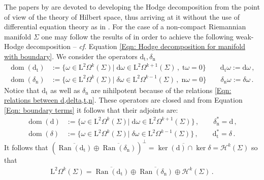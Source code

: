 	The papers by \parencite{Axelsson-McIntosh-04,Gaffney-55} are devoted to developing the Hodge decomposition from the point of view of the theory of Hilbert space, thus arriving at it without the use of differential equation theory as in \parencite{Schwarz-95}. For the case of a non-compact Riemannian manifold $\Sigma$ one may follow the results of \parencite{Axelsson-McIntosh-04} in order to achieve the following weak-Hodge decomposition -- \textit{cf}. Equation \eqref{Eqn: Hodge decomposition for manifold with boundary}.
	We consider the operators $\mathrm{d}_{\mathrm{t}},\delta_{\mathrm{n}}$
	\begin{align}
		\label{Eqn: Dirichlet differential}
		\operatorname{dom}(\mathrm{d}_{\mathrm{t}})&:=\lbrace
		\omega\in\mathrm{L}^2\Omega^k(\Sigma)|\;\mathrm{d}\omega\in\mathrm{L}^2\Omega^{k+1}(\Sigma)\,,\;\mathrm{t}\omega=0\rbrace\qquad
		\mathrm{d}_{\mathrm{t}}\omega:=\mathrm{d}\omega\,,\\
		\label{Eqn: Neumann codifferential}
		\operatorname{dom}(\delta_{\mathrm{n}})&:=\lbrace
		\omega\in\mathrm{L}^2\Omega^k(\Sigma)|\;\delta\omega\in\mathrm{L}^2\Omega^{k-1}(\Sigma)\,,\;\mathrm{n}\omega=0\rbrace\qquad
		\delta_{\mathrm{n}}\omega:=\delta\omega\,.
	\end{align}
	Notice that $\mathrm{d}_{\mathrm{t}}$ as well as $\delta_{\mathrm{n}}$ are nihilpotent because of the relations \eqref{Eqn: relations between d,delta,t,n}.
	These operators are closed and from Equation \eqref{Eqn: boundary terms} it follows that their adjoints are:
	\begin{align*}
		\operatorname{dom}(\mathrm{d})&:=\lbrace
		\omega\in\mathrm{L}^2\Omega^k(\Sigma)|\;\mathrm{d}\omega\in\mathrm{L}^2\Omega^{k+1}(\Sigma)\rbrace\,,\qquad
		\delta_{\mathrm{n}}^*=\mathrm{d}\,,\\
		\operatorname{dom}(\delta)&:=\lbrace
		\omega\in\mathrm{L}^2\Omega^k(\Sigma)|\;\delta\omega\in\mathrm{L}^2\Omega^{k-1}(\Sigma)\rbrace\,,\qquad
		\mathrm{d}_{\mathrm{t}}^*=\delta\,.
	\end{align*}
	It follows that $(\overline{\operatorname{Ran}(\mathrm{d}_{\mathrm{t}})}\oplus\overline{\operatorname{Ran}(\delta_{\mathrm{n}})})^\perp=\overline{\ker(\mathrm{d})\cap\ker\delta}=\mathcal{H}^k(\Sigma)$ so that
	\begin{align}\label{Eqn: weak-Hodge decomposition for boundary}
		\mathrm{L}^2\Omega^k(\Sigma)=
		\overline{\operatorname{Ran}(\mathrm{d}_{\mathrm{t}})}\oplus
		\overline{\operatorname{Ran}(\delta_{\mathrm{n}})}\oplus
		\mathcal{H}^k(\Sigma)\,.
	\end{align}
